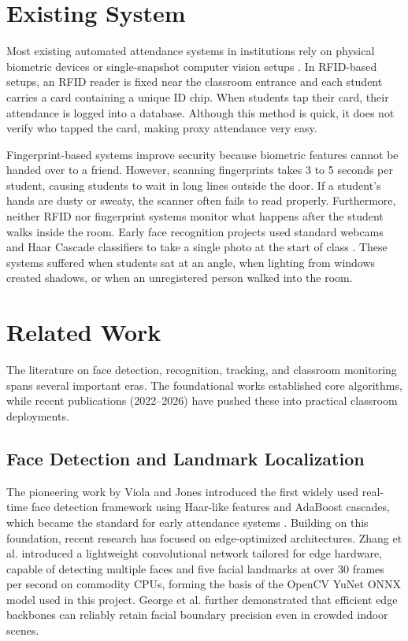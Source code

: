 \documentclass[10pt]{report}
\begin{document}
\section{Existing System}
\hspace{0.5cm}Most existing automated attendance systems in institutions rely on physical biometric devices or single-snapshot computer vision setups \cite{chintalapati2013automated, raj2024facial, rajesh2023smart}. In RFID-based setups, an RFID reader is fixed near the classroom entrance and each student carries a card containing a unique ID chip. When students tap their card, their attendance is logged into a database. Although this method is quick, it does not verify who tapped the card, making proxy attendance very easy.

\hspace{0.5cm}Fingerprint-based systems improve security because biometric features cannot be handed over to a friend. However, scanning fingerprints takes 3 to 5 seconds per student, causing students to wait in long lines outside the door. If a student's hands are dusty or sweaty, the scanner often fails to read properly. Furthermore, neither RFID nor fingerprint systems monitor what happens after the student walks inside the room. Early face recognition projects used standard webcams and Haar Cascade classifiers \cite{viola2004robust} to take a single photo at the start of class \cite{chintalapati2013automated, angulakshmi2024face}. These systems suffered when students sat at an angle, when lighting from windows created shadows, or when an unregistered person walked into the room.

\section{Related Work}
\hspace{0.5cm}The literature on face detection, recognition, tracking, and classroom monitoring spans several important eras. The foundational works established core algorithms, while recent publications (2022--2026) have pushed these into practical classroom deployments.

\subsection{Face Detection and Landmark Localization}
\hspace{0.5cm}The pioneering work by Viola and Jones \cite{viola2004robust} introduced the first widely used real-time face detection framework using Haar-like features and AdaBoost cascades, which became the standard for early attendance systems \cite{chintalapati2013automated}. Building on this foundation, recent research has focused on edge-optimized architectures. Zhang et al. \cite{zhang2023realtime} introduced a lightweight convolutional network tailored for edge hardware, capable of detecting multiple faces and five facial landmarks at over 30 frames per second on commodity CPUs, forming the basis of the OpenCV YuNet ONNX model used in this project. George et al. \cite{george2024edgeface} further demonstrated that efficient edge backbones can reliably retain facial boundary precision even in crowded indoor scenes.
\end{document}
